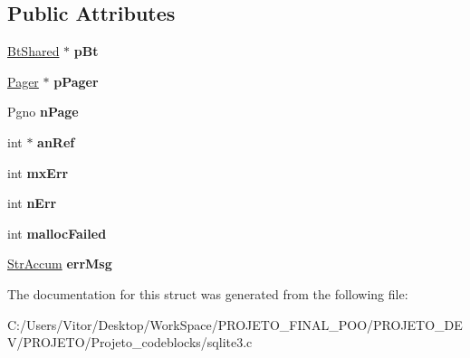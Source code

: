 \subsection*{Public Attributes}
\begin{DoxyCompactItemize}
\item 
\hypertarget{struct_integrity_ck_a65f03f54514f504bd871bb2ccd3da188}{\hyperlink{struct_bt_shared}{Bt\-Shared} $\ast$ {\bfseries p\-Bt}}\label{struct_integrity_ck_a65f03f54514f504bd871bb2ccd3da188}

\item 
\hypertarget{struct_integrity_ck_a87e7f8b012b61b61fae359269cbacce4}{\hyperlink{struct_pager}{Pager} $\ast$ {\bfseries p\-Pager}}\label{struct_integrity_ck_a87e7f8b012b61b61fae359269cbacce4}

\item 
\hypertarget{struct_integrity_ck_a04f496ef7239aea6dccb6a861bb5a798}{Pgno {\bfseries n\-Page}}\label{struct_integrity_ck_a04f496ef7239aea6dccb6a861bb5a798}

\item 
\hypertarget{struct_integrity_ck_a8bf40e4a2f13ad3e101f1a4dd7a08ff6}{int $\ast$ {\bfseries an\-Ref}}\label{struct_integrity_ck_a8bf40e4a2f13ad3e101f1a4dd7a08ff6}

\item 
\hypertarget{struct_integrity_ck_a9daa97cdcb1366c503451ab2af9e7ba6}{int {\bfseries mx\-Err}}\label{struct_integrity_ck_a9daa97cdcb1366c503451ab2af9e7ba6}

\item 
\hypertarget{struct_integrity_ck_a52c815a1d19be87d0ab4dc0a4e4d38e2}{int {\bfseries n\-Err}}\label{struct_integrity_ck_a52c815a1d19be87d0ab4dc0a4e4d38e2}

\item 
\hypertarget{struct_integrity_ck_a8e448c1d6483a0326a7ec39291782030}{int {\bfseries malloc\-Failed}}\label{struct_integrity_ck_a8e448c1d6483a0326a7ec39291782030}

\item 
\hypertarget{struct_integrity_ck_a1e9b79bb1d7b22a840001333200a950e}{\hyperlink{struct_str_accum}{Str\-Accum} {\bfseries err\-Msg}}\label{struct_integrity_ck_a1e9b79bb1d7b22a840001333200a950e}

\end{DoxyCompactItemize}


The documentation for this struct was generated from the following file\-:\begin{DoxyCompactItemize}
\item 
C\-:/\-Users/\-Vitor/\-Desktop/\-Work\-Space/\-P\-R\-O\-J\-E\-T\-O\-\_\-\-F\-I\-N\-A\-L\-\_\-\-P\-O\-O/\-P\-R\-O\-J\-E\-T\-O\-\_\-\-D\-E\-V/\-P\-R\-O\-J\-E\-T\-O/\-Projeto\-\_\-codeblocks/sqlite3.\-c\end{DoxyCompactItemize}
